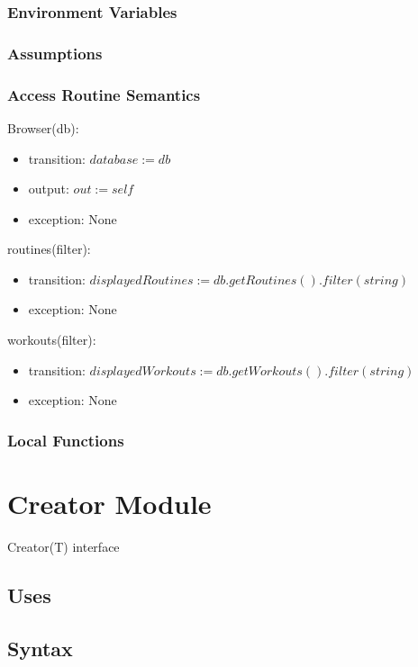 \documentclass[12pt, titlepage]{article}
\begin{document}
\subsubsection{Environment Variables}

\subsubsection{Assumptions}

\subsubsection{Access Routine Semantics}

\noindent Browser(db):
\begin{itemize}
	\item transition: $database := db$
	\item output: $out := self$
	\item exception: None
\end{itemize}

\noindent routines(filter):
\begin{itemize}
	\item transition: $displayedRoutines := db.getRoutines().filter(string)$
	\item exception: None
\end{itemize}

\noindent workouts(filter):
\begin{itemize}
	\item transition: $displayedWorkouts := db.getWorkouts().filter(string)$
	\item exception: None
\end{itemize}

\subsubsection{Local Functions}

\newpage

\section{Creator Module}
Creator(T) interface
\subsection{Uses}

\subsection{Syntax}
\end{document}
